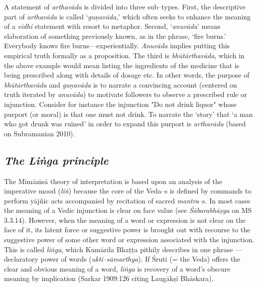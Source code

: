 A statement of \textit{arthavāda} is divided into three sub–types. First, the descriptive part of \textit{arthavāda} is called ‘\textit{guṇavāda},’ which often seeks to enhance the meaning of a \textit{vidhi }statement with resort to metaphor. Second, ‘\textit{anuvāda}’ means elaboration of something previously known, as in the phrase, ‘fire burns.’ Everybody knows fire burns—experientially. \textit{Anuvāda} implies putting this empirical truth formally as a proposition. The third is \textit{bhūtārthavāda}, which in the above example would mean listing the ingredients of the medicine that is being prescribed along with details of dosage etc. In other words, the purpose of \textit{bhūtārthavāda} and \textit{guṇavāda }is to narrate a convincing account (centered on truth iterated by \textit{anuvāda}) to motivate followers to observe a prescribed rule or injunction. Consider for instance the injunction "Do not drink liquor" whose purport (or moral) is that one must not drink. To narrate the ‘story’ that ‘a man who got drunk was ruined’ in order to expand this purport is \textit{arthavāda} (based on Subramanian 2010).


\subsection*{\textit{The Liṅga principle}}

The Mīmāṁsā theory of interpretation is based upon an analysis of the imperative mood (\textit{liṅ}) because the core of the Veda–s is defined by commands to perform yājñic acts accompanied by recitation of sacred \textit{mantra}–s. In most cases the meaning of a Vedic injunction is clear on face value (see \textit{Śābarabhāṣya} on MS 3.3.14). However, when the meaning of a word or expression is not clear on the face of it, its latent force or suggestive power is brought out with recourse to the suggestive power of some other word or expression associated with the injunction. This is called \textit{liṅga}, which Kumārila Bhaṭṭa pithily describes in one phrase — declaratory power of words (\textit{ukti–sāmarthya}). If Śruti (= the Veda) offers the clear and obvious meaning of a word, \textit{liṅga} is recovery of a word’s obscure meaning by implication (Sarkar 1909:126 citing Laugākṣī Bhāskara).


